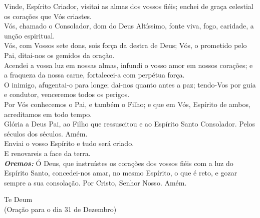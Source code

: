 \begin{flushleft}
    Vinde, Espírito Criador, visitai as almas dos vossos fiéis; enchei de graça celestial os corações que Vós criastes.
    \vspace{.2cm} \\
    Vós, chamado o Consolador, dom do Deus Altíssimo, fonte viva, fogo, caridade, a unção espiritual.
    \vspace{.2cm} \\
    Vós, com Vossos sete dons, sois força da destra de Deus; Vós, o prometido pelo Pai, ditai-nos os gemidos da oração.
    \vspace{.2cm} \\
    Acendei a vossa luz em nossas almas, infundi o vosso amor em nossos corações; e a fraqueza da nossa carne, fortalecei-a com perpétua força.
    \vspace{.2cm} \\
    O inimigo, afugentai-o para longe; dai-nos quanto antes a paz; tendo-Vos por guia e condutor, venceremos todos os perigos.
    \vspace{.2cm} \\
    Por Vós conhecemos o Pai, e também o Filho; e que em Vós, Espírito de ambos, acreditamos em todo tempo.
    \vspace{.2cm} \\
    Glória a Deus Pai, ao Filho que ressuscitou e ao Espírito Santo Consolador. Pelos séculos dos séculos. Amém.
    \vspace{.2cm} \\
    \VbarRed{} Enviai o vosso Espírito e tudo será criado. \\
    \RbarRed{} E renovareis a face da terra.
    \vspace{.2cm} \\
    \textbf{\textit{Oremos:}} Ó Deus, que instruístes os corações dos vossos fiéis com a luz do Espírito Santo, concedei-nos amar, no mesmo Espírito, o que é reto, e gozar sempre a sua consolação. Por Cristo, Senhor Nosso. Amém.
\end{flushleft}
\newpage
\begin{center}
    Te Deum \\ \textcolor{VioletRed3}{\scriptsize{(Oração para o dia 31 de Dezembro)}}
\end{center}
